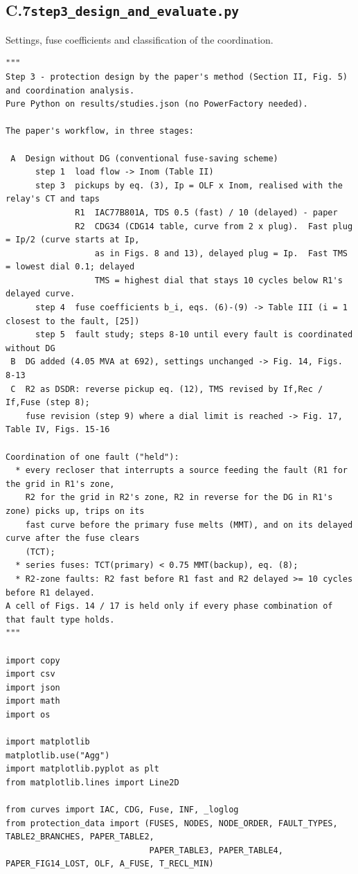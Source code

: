 \documentclass[12pt,a4paper]{article}
\begin{document}
\subsection*{C.7\quad \texttt{step3\_design\_and\_evaluate.py}}
Settings, fuse coefficients and classification of the coordination.
\begin{lstlisting}
"""
Step 3 - protection design by the paper's method (Section II, Fig. 5) and coordination analysis.
Pure Python on results/studies.json (no PowerFactory needed).

The paper's workflow, in three stages:

 A  Design without DG (conventional fuse-saving scheme)
      step 1  load flow -> Inom (Table II)
      step 3  pickups by eq. (3), Ip = OLF x Inom, realised with the relay's CT and taps
              R1  IAC77B801A, TDS 0.5 (fast) / 10 (delayed) - paper
              R2  CDG34 (CDG14 table, curve from 2 x plug).  Fast plug = Ip/2 (curve starts at Ip,
                  as in Figs. 8 and 13), delayed plug = Ip.  Fast TMS = lowest dial 0.1; delayed
                  TMS = highest dial that stays 10 cycles below R1's delayed curve.
      step 4  fuse coefficients b_i, eqs. (6)-(9) -> Table III (i = 1 closest to the fault, [25])
      step 5  fault study; steps 8-10 until every fault is coordinated without DG
 B  DG added (4.05 MVA at 692), settings unchanged -> Fig. 14, Figs. 8-13
 C  R2 as DSDR: reverse pickup eq. (12), TMS revised by If,Rec / If,Fuse (step 8);
    fuse revision (step 9) where a dial limit is reached -> Fig. 17, Table IV, Figs. 15-16

Coordination of one fault ("held"):
  * every recloser that interrupts a source feeding the fault (R1 for the grid in R1's zone,
    R2 for the grid in R2's zone, R2 in reverse for the DG in R1's zone) picks up, trips on its
    fast curve before the primary fuse melts (MMT), and on its delayed curve after the fuse clears
    (TCT);
  * series fuses: TCT(primary) < 0.75 MMT(backup), eq. (8);
  * R2-zone faults: R2 fast before R1 fast and R2 delayed >= 10 cycles before R1 delayed.
A cell of Figs. 14 / 17 is held only if every phase combination of that fault type holds.
"""

import copy
import csv
import json
import math
import os

import matplotlib
matplotlib.use("Agg")
import matplotlib.pyplot as plt
from matplotlib.lines import Line2D

from curves import IAC, CDG, Fuse, INF, _loglog
from protection_data import (FUSES, NODES, NODE_ORDER, FAULT_TYPES, TABLE2_BRANCHES, PAPER_TABLE2,
                             PAPER_TABLE3, PAPER_TABLE4, PAPER_FIG14_LOST, OLF, A_FUSE, T_RECL_MIN)


\end{lstlisting}
\end{document}
